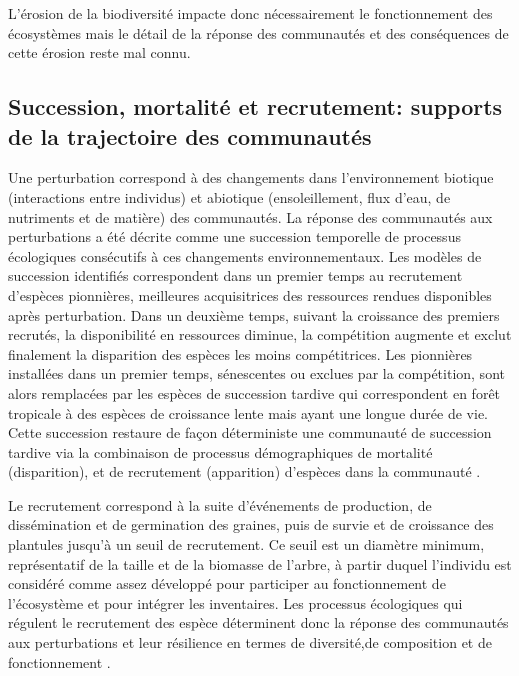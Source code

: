 \documentclass[
  11pt,
  french,
  A4paper,
  extrafontsizes,onecolumn,openright
  ]{memoir}
\begin{document}
L'érosion de la biodiversité impacte donc nécessairement le
fonctionnement des écosystèmes mais le détail de la réponse des
communautés et des conséquences de cette érosion reste mal connu.

\subsection{Succession, mortalité et recrutement: supports de la
trajectoire des
communautés}\label{succession-mortalite-et-recrutement-supports-de-la-trajectoire-des-communautes}

Une perturbation correspond à des changements dans l'environnement
biotique (interactions entre individus) et abiotique (ensoleillement,
flux d'eau, de nutriments et de matière) des communautés. La réponse des
communautés aux perturbations a été décrite comme une succession
temporelle de processus écologiques consécutifs à ces changements
environnementaux. Les modèles de succession identifiés correspondent
dans un premier temps au recrutement d'espèces pionnières, meilleures
acquisitrices des ressources rendues disponibles après perturbation.
Dans un deuxième temps, suivant la croissance des premiers recrutés, la
disponibilité en ressources diminue, la compétition augmente et exclut
finalement la disparition des espèces les moins compétitrices. Les
pionnières installées dans un premier temps, sénescentes ou exclues par
la compétition, sont alors remplacées par les espèces de succession
tardive qui correspondent en forêt tropicale à des espèces de croissance
lente mais ayant une longue durée de vie. Cette succession restaure de
façon déterministe une communauté de succession tardive via la
combinaison de processus démographiques de mortalité (disparition), et
de recrutement (apparition) d'espèces dans la communauté
\autocite{Denslow2000}.

Le recrutement correspond à la suite d'événements de production, de
dissémination et de germination des graines, puis de survie et de
croissance des plantules jusqu'à un seuil de recrutement. Ce seuil est
un diamètre minimum, représentatif de la taille et de la biomasse de
l'arbre, à partir duquel l'individu est considéré comme assez développé
pour participer au fonctionnement de l'écosystème et pour intégrer les
inventaires. Les processus écologiques qui régulent le recrutement des
espèce déterminent donc la réponse des communautés aux perturbations et
leur résilience en termes de diversité,de composition et de
fonctionnement \autocites{Denslow1980}{Schnitzer2001}{Asner2004}.
\end{document}
